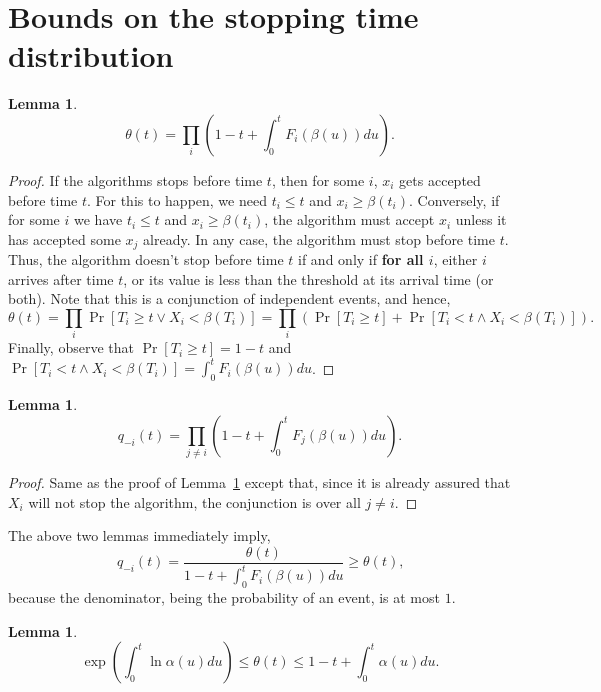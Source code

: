 \documentclass[10pt, letterpaper, twoside]{article}
\newtheorem{lemma}[theorem]{Lemma}
\begin{document}
\section{Bounds on the stopping time distribution}

\begin{lemma}\label{lem_theta}
\[\theta(t)=\prod_i\left(1-t+\int_0^tF_i(\beta(u))du\right)\text{.}\]
\end{lemma}

\begin{proof}
If the algorithms stops before time $t$, then for some $i$, $x_i$ gets accepted before time $t$. For this to happen, we need $t_i\leq t$ and $x_i\geq\beta(t_i)$. Conversely, if for some $i$ we have $t_i\leq t$ and $x_i\geq\beta(t_i)$, the algorithm must accept $x_i$ unless it has accepted some $x_j$ already. In any case, the algorithm must stop before time $t$. Thus, the algorithm doesn't stop before time $t$ if and only if \textbf{for all $i$}, either $i$ arrives after time $t$, or its value is less than the threshold at its arrival time (or both). Note that this is a conjunction of independent events, and hence,
\[\theta(t)=\prod_i\Pr[T_i\geq t\vee X_i<\beta(T_i)]=\prod_i\left(\Pr[T_i\geq t]+\Pr[T_i<t\wedge X_i<\beta(T_i)]\right)\text{.}\]
Finally, observe that $\Pr[T_i\geq t]=1-t$ and $\Pr[T_i<t\wedge X_i<\beta(T_i)]=\int_0^tF_i(\beta(u))du$.
\end{proof}

\begin{lemma}
\[q_{-i}(t)=\prod_{j\neq i}\left(1-t+\int_0^tF_j(\beta(u))du\right)\text{.}\]
\end{lemma}

\begin{proof}
Same as the proof of Lemma~\ref{lem_theta} except that, since it is already assured that $X_i$ will not stop the algorithm, the conjunction is over all $j\neq i$.
\end{proof}

The above two lemmas immediately imply,
\begin{equation}\label{eqn_q_theta}
q_{-i}(t)=\frac{\theta(t)}{1-t+\int_0^tF_i(\beta(u))du}\geq\theta(t)\text{,}
\end{equation}
because the denominator, being the probability of an event, is at most $1$.

\begin{lemma}
\[\exp\left(\int_0^t\ln\alpha(u)du\right)\leq\theta(t)\leq1-t+\int_0^t\alpha(u)du\text{.}\]
\end{lemma}
\end{document}
